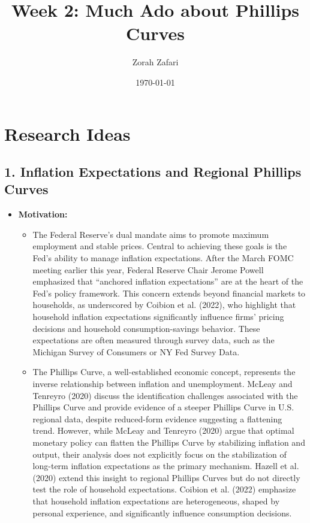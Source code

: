 \documentclass[10pt]{article}
\title{Week 2: Much Ado about Phillips Curves}
\author{Zorah Zafari}
\date{\today}
\begin{document}
\maketitle

\section*{Research Ideas}



\subsection*{1. Inflation Expectations and Regional Phillips Curves}

\begin{itemize}
\item \textbf{Motivation:}
\begin{itemize}
\item The Federal Reserve's dual mandate aims to promote maximum employment and stable prices. Central to achieving these goals is the Fed's ability to manage inflation expectations. After the March FOMC meeting earlier this year, Federal Reserve Chair Jerome Powell emphasized that ``anchored inflation expectations'' are at the heart of the Fed's policy framework. This concern extends beyond financial markets to households, as underscored by Coibion et al. (2022), who highlight that household inflation expectations significantly influence firms' pricing decisions and household consumption-savings behavior. These expectations are often measured through survey data, such as the Michigan Survey of Consumers or NY Fed Survey Data.

\item The Phillips Curve, a well-established economic concept, represents the inverse relationship between inflation and unemployment. McLeay and Tenreyro (2020) discuss the identification challenges associated with the Phillips Curve and provide evidence of a steeper Phillips Curve in U.S. regional data, despite reduced-form evidence suggesting a flattening trend. However, while McLeay and Tenreyro (2020) argue that optimal monetary policy can flatten the Phillips Curve by stabilizing inflation and output, their analysis does not explicitly focus on the stabilization of long-term inflation expectations as the primary mechanism. Hazell et al. (2020) extend this insight to regional Phillips Curves but do not directly test the role of household expectations. Coibion et al. (2022) emphasize that household inflation expectations are heterogeneous, shaped by personal experience, and significantly influence consumption decisions.


\end{itemize}
\end{itemize}
\end{document}
